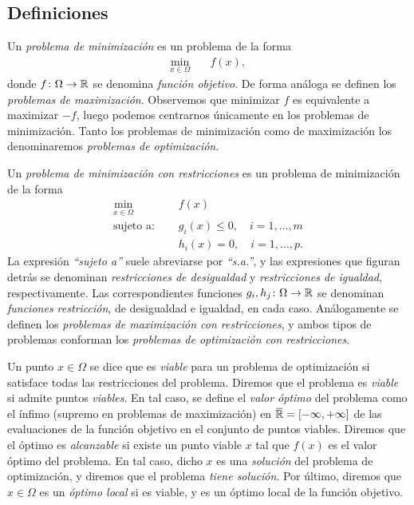 \subsection{Definiciones}

\begin{definition}
    Un \emph{problema de minimización} es un problema de la forma
    \begin{align*}
        \min_{x \in \Omega} &\quad f(x),
    \end{align*}
    donde $f\colon \Omega \to \mathbb{R}$ se denomina \emph{función objetivo}. De forma análoga se definen los \emph{problemas de maximización}. Observemos que minimizar $f$ es equivalente a maximizar $-f$, luego podemos centrarnos únicamente en los problemas de minimización. Tanto los problemas de minimización como de maximización los denominaremos \emph{problemas de optimización}.

    Un \emph{problema de minimización con restricciones} es un problema de minimización de la forma
    \begin{align*}
        \min_{x \in \Omega} &\quad f(x)  \\
        \text{sujeto a: } &\quad g_i(x) \le 0, \quad i=1,\dots,m \\
                          &\quad h_i(x) = 0, \quad i=1,\dots,p.
    \end{align*}
    La expresión \emph{``sujeto a''} suele abreviarse por \emph{``s.a.''}, y las expresiones que figuran detrás se denominan \emph{restricciones de desigualdad} y \emph{restricciones de igualdad}, respectivamente. Las correspondientes funciones $g_i,h_j \colon \Omega \to \mathbb{R}$ se denominan \emph{funciones restricción}, de desigualdad e igualdad, en cada caso. Análogamente se definen los \emph{problemas de maximización con restricciones}, y ambos tipos de problemas conforman los \emph{problemas de optimización con restricciones}.

    Un punto $x \in \Omega$ se dice que es \emph{viable} para un problema de optimización si satisface todas las restricciones del problema. Diremos que el problema es \emph{viable} si admite puntos \emph{viables}. En tal caso, se define el \emph{valor óptimo} del problema como el ínfimo (supremo en problemas de maximización) en $\closure{\R} = [-\infty,+\infty]$ de las evaluaciones de la función objetivo en el conjunto de puntos viables. Diremos que el óptimo es \emph{alcanzable} si existe un punto viable $x$ tal que $f(x)$ es el valor óptimo del problema. En tal caso, dicho $x$ es una \emph{solución} del problema de optimización, y diremos que el problema \emph{tiene solución}. Por último, diremos que $x \in \Omega$ es un \emph{óptimo local} si es viable, y es un óptimo local de la función objetivo.


\end{definition}
